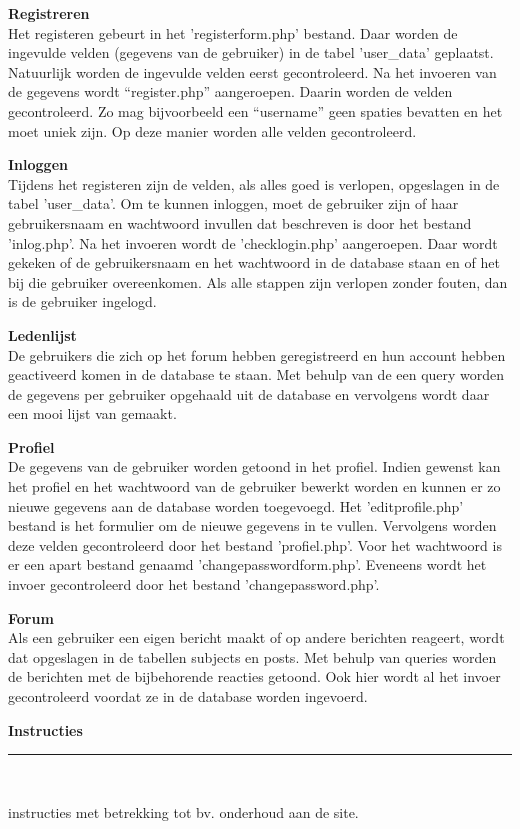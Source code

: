 \documentclass[a4paper,12pt]{article}
\newcommand{\HRule}{\rule{\linewidth}{0.5mm}}
\begin{document}
{\bfseries Registreren} \\
Het registeren gebeurt in het 'registerform.php' bestand. Daar worden de ingevulde velden (gegevens van de gebruiker) in de tabel 'user\_data' geplaatst. Natuurlijk worden de ingevulde velden eerst gecontroleerd. Na het invoeren van de gegevens wordt “register.php” aangeroepen. Daarin worden de velden gecontroleerd. Zo mag bijvoorbeeld een “username” geen spaties bevatten en het moet uniek zijn. Op deze manier worden alle velden gecontroleerd. 

{\bfseries Inloggen}\\
Tijdens het registeren zijn de velden, als alles goed is verlopen, opgeslagen in de tabel 'user\_data'. Om te kunnen inloggen, moet de gebruiker zijn of haar gebruikersnaam en wachtwoord invullen dat beschreven is door het bestand 'inlog.php'. Na het invoeren wordt de 'checklogin.php' aangeroepen. Daar wordt gekeken of de gebruikersnaam en het wachtwoord in de database staan en of het bij die gebruiker overeenkomen. Als alle stappen zijn verlopen zonder fouten, dan is de gebruiker ingelogd.

{\bfseries Ledenlijst}\\
De gebruikers die zich op het forum hebben geregistreerd en hun account hebben geactiveerd komen in de database te staan. Met behulp van de een query worden de gegevens per gebruiker opgehaald uit de database en vervolgens wordt daar een mooi lijst van gemaakt. 

{\bfseries Profiel}\\
De gegevens van de gebruiker worden getoond in het profiel. Indien gewenst kan het profiel en het wachtwoord van de gebruiker bewerkt worden en kunnen er zo nieuwe gegevens aan de database worden toegevoegd. Het 'editprofile.php' bestand is het formulier om de nieuwe gegevens in te vullen. Vervolgens worden deze velden gecontroleerd door het bestand 'profiel.php'. Voor het wachtwoord is er een apart bestand genaamd 'changepasswordform.php'. Eveneens wordt het invoer gecontroleerd door het bestand 'changepassword.php'. 

{\bfseries Forum}\\
Als een gebruiker een eigen bericht maakt of op andere berichten reageert, wordt dat opgeslagen in de tabellen subjects en posts. Met behulp van queries worden de berichten met de bijbehorende reacties getoond. Ook hier wordt al het invoer gecontroleerd voordat ze in de database worden ingevoerd.\\



\newpage
\begin{center}
{\LARGE \bfseries Instructies}\\[0.1cm]
\HRule \\[0.5cm]
\end{center}
instructies met betrekking tot bv. onderhoud aan de site.
\end{document}
